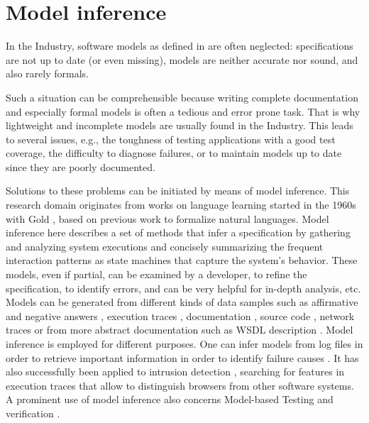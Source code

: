 \section{Model inference}
\label{sec:related:modelinf}

In the Industry, software models as defined in
 are
often neglected: specifications are not up to date (or even
missing), models are neither accurate nor sound, and also rarely
formals.

Such a situation can be comprehensible because writing complete
documentation and especially formal models is often a tedious and
error prone task. That is why lightweight and incomplete models
are usually found in the Industry. This leads to several issues,
e.g., the toughness of testing applications with a good test
coverage, the difficulty to diagnose failures, or to maintain
models up to date since they are poorly documented.

Solutions to these problems can be initiated by means of model
inference. This research domain originates from works on language
learning started in the 1960s with Gold \cite{Gold1978302}, based
on previous work to formalize natural languages. Model inference
here describes a set of methods that infer a specification by
gathering and analyzing system executions and concisely
summarizing the frequent interaction patterns as state machines
that capture the system's behavior. These models, even if
partial, can be examined by a developer, to refine the
specification, to identify errors, and can be very helpful for
in-depth analysis, etc. Models can be generated from different
kinds of data samples such as affirmative and negative answers
\cite{Angluin198787}, execution traces
\cite{Krka:2010:UDE:1810295.1810324}, documentation
\cite{ZhongZXM11}, source code
\cite{Salah05scenariographer,Pradel:2009}, network traces
\cite{6079839} or from more abstract documentation such as WSDL
description \cite{Bertolino:2009:ASB:1595696.1595719}.  Model
inference is employed for different purposes. One can infer
models from log files in order to retrieve important information
in order to identify failure causes \cite{4700316}. It has also
successfully been applied to intrusion detection \cite{debar00},
searching for features in execution traces that allow to
distinguish browsers from other software systems. A prominent use
of model inference also concerns Model-based Testing
\cite{Lorenzoli2008, Meinke11,MobiGUITARIEEESoftware2014} and
verification \cite{Ammons:2002:MS:565816.503275,5416728}.

